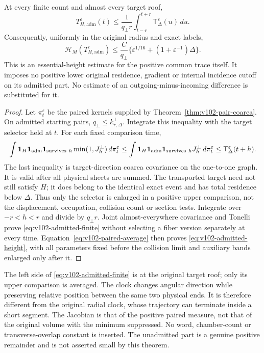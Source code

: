 \begin{theorem}
\label{thm:v102-admitted-height}
At every finite count and almost every target roof,
\begin{equation}\label{eq:v102-admitted-finite}
 T_{H,\mathrm{adm}}^\varepsilon(t)
       \le \frac{1}{q_\perp r}
              \int_{t-r}^{t+r}\mathsf T_\Delta^\varepsilon(u)\,du.
\end{equation}
Consequently, uniformly in the original radius and exact labels,
\begin{equation}\label{eq:v102-admitted-height}
 \mathcal H_M(T_{H,\mathrm{adm}}^\varepsilon)
 \le \frac C{q_\perp}
          \{\varepsilon^{1/16}+(1+\varepsilon^{-1})\Delta\}.
\end{equation}
This is an essential-height estimate for the positive common trace
itself. It imposes no positive lower original residence, gradient
or internal incidence cutoff on its admitted part. No estimate of
an outgoing-minus-incoming difference is substituted for it.
\end{theorem}
\begin{proof}
Let $\pi_t^\varepsilon$ be the paired kernels supplied by
Theorem~\ref{thm:v102-pair-coarea}. On admitted starting pairs,
$q_\perp\le k_{r,\Delta}^\perp$. Integrate this inequality with
the target selector held at $t$. For each fixed comparison time,
\[
 \int\mathbf1_H\mathbf1_{\mathrm{adm}}
 \mathbf1_{\mathrm{survives}\ h}\min(1,J_h^\perp)\,d\pi_t^\varepsilon
 \le\int\mathbf1_H\mathbf1_{\mathrm{adm}}
 \mathbf1_{\mathrm{survives}\ h}J_h^\perp\,d\pi_t^\varepsilon
 \le\mathsf T_\Delta^\varepsilon(t+h).
\]
The last inequality is target-direction coarea covariance on the
one-to-one graph. It is valid after all physical sheets are summed.
The transported target need not still satisfy $H$; it does belong
to the identical exact event and has total residence below $\Delta$.
Thus only the selector is enlarged in a positive upper comparison,
not the displacement, occupation, collision count or section tests.
Integrate over $-r<h<r$ and divide by $q_\perp r$.
Joint almost-everywhere covariance and Tonelli prove
\eqref{eq:v102-admitted-finite} without selecting a fiber version
separately at every time. Equation~\eqref{eq:v102-paired-average}
then proves \eqref{eq:v102-admitted-height}, with all parameters
fixed before the collision limit and auxiliary bands enlarged only
after it.
\end{proof}

\begin{remark}
The left side of \eqref{eq:v102-admitted-finite} is at the original
target roof; only its upper comparison is averaged. The clock
changes angular direction while preserving relative position between
the same two physical ends. It is therefore different from the
original radial clock, whose trajectory can terminate inside a short
segment. The Jacobian is that of the positive paired measure, not
that of the original volume with the minimum suppressed. No word,
chamber-count or transverse-overlap constant is inserted. The
unadmitted part is a genuine positive remainder and is not asserted
small by this theorem.
\end{remark}
